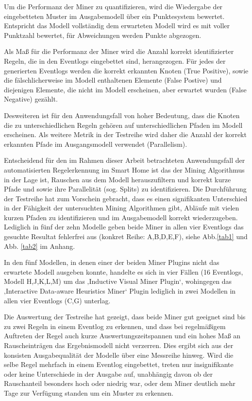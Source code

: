 Um die Performanz der Miner zu quantifizieren, wird  die Wiedergabe der eingebetteten Muster im Ausgabemodell über ein Punktesystem bewertet. Entspricht das Modell vollständig dem erwarteten Modell wird es mit voller Punktzahl bewertet, für Abweichungen werden Punkte abgezogen.

Als Maß für die Performanz der Miner wird die Anzahl korrekt identifizierter Regeln, die in den Eventlogs eingebettet sind, herangezogen. Für jedes der generierten Eventlogs werden die korrekt erkannten Knoten (True Positive), sowie die fälschlicherweise im Modell enthaltenen Elemente (False Postive) und diejenigen Elemente, die nicht im Modell erscheinen, aber erwartet wurden (False Negative) gezählt. 

Desweiteren ist für den Anwendungsfall von hoher Bedeutung, dass die Knoten die zu unterschiedlichen Regeln gehören auf unterschiedlichen Pfaden im Modell erscheinen. Als weitere Metrik in der Testreihe wird daher die Anzahl der korrekt erkannten Pfade im Ausgangsmodell verwendet (Parallelism). 

Entscheidend für den im Rahmen dieser Arbeit betrachteten Anwendungsfall der automatisierten Regelerkennung im Smart Home ist das der Mining Algorithmus in der Lage ist, Rauschen aus dem Modell herauszufiltern und korrekt kurze Pfade und sowie ihre Parallelität (sog. Splits) zu identifizieren. 
Die Durchführung der Testreihe hat zum Vorschein gebracht, dass es einen signifikanten Unterschied in der Fähigkeit der untersuchten Mining Algorithmen gibt, Abläufe mit vielen kurzen Pfaden zu identifizieren und im Ausgabemodell korrekt wiederzugeben. Lediglich in fünf der zehn Modelle geben beide Miner in allen vier Eventlogs das gesuchte Resultat fehlerfrei aus (konkret Reihe: A,B,D,E,F), siehe Abb.\ref{tab1} und Abb. \ref{tab2} im Anhang.

In den fünf Modellen, in denen einer der beiden Miner Plugins nicht das erwartete Modell ausgeben konnte, handelte es sich in vier Fällen (16 Eventlogs, Modell H,J,K,L,M) um das ‚Inductive Visual Miner Plugin‘, wohingegen das ‚Interactive Data-aware Heuristics Miner‘ Plugin lediglich in zwei Modellen in allen vier Eventlogs (C,G) unterlag.

Die Auswertung der Testreihe hat gezeigt, dass beide Miner gut geeignet sind bis zu zwei Regeln in einem Eventlog zu erkennen, und dass bei regelmäßigem Auftreten der Regel auch kurze Auswertungszeitspannen und ein hohes Maß an Rauscheinträgen das Ergebnismodell nicht verzerren. Dies ergibt sich aus der konsisten Ausgabequalität der Modelle über eine Messreihe hinweg. Wird die selbe Regel mehrfach in einem Eventlog eingebettet, treten nur insignifikante oder keine Unterschiede in der Ausgabe auf, unabhängig davon ob der Rauschanteil besonders hoch oder niedrig war, oder dem Miner deutlich mehr Tage zur Verfügung standen um ein Muster zu erkennen.


